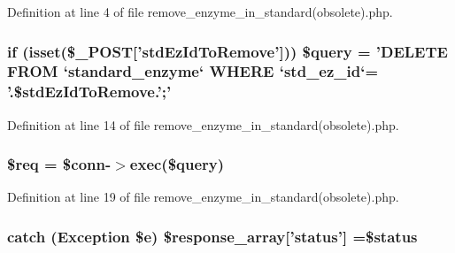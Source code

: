Definition at line 4 of file remove\-\_\-enzyme\-\_\-in\-\_\-standard(obsolete).\-php.

\hypertarget{remove__enzyme__in__standard_07obsolete_08_8php_a46a28a65a24f7a31388b22d12d2bb16a}{
\subsubsection[{\$query}]{\setlength{\rightskip}{0pt plus 5cm}if (isset(\$\-\_\-\-P\-O\-S\-T\mbox{[}'std\-Ez\-Id\-To\-Remove'\mbox{]})) \$query = 'D\-E\-L\-E\-T\-E F\-R\-O\-M `standard\-\_\-enzyme` W\-H\-E\-R\-E `std\-\_\-ez\-\_\-id`= '.\$std\-Ez\-Id\-To\-Remove.';'}}\label{remove__enzyme__in__standard_07obsolete_08_8php_a46a28a65a24f7a31388b22d12d2bb16a}


Definition at line 14 of file remove\-\_\-enzyme\-\_\-in\-\_\-standard(obsolete).\-php.

\hypertarget{remove__enzyme__in__standard_07obsolete_08_8php_a63a7a283ea5dee8af1e2d5a3435bf370}{
\subsubsection[{\$req}]{\setlength{\rightskip}{0pt plus 5cm}\$req = \$conn-\/$>$exec(\$query)}}\label{remove__enzyme__in__standard_07obsolete_08_8php_a63a7a283ea5dee8af1e2d5a3435bf370}


Definition at line 19 of file remove\-\_\-enzyme\-\_\-in\-\_\-standard(obsolete).\-php.

\hypertarget{remove__enzyme__in__standard_07obsolete_08_8php_a8452fb8131316637a04e25f5fde066d9}{
\subsubsection[{\$response\-\_\-array}]{\setlength{\rightskip}{0pt plus 5cm}catch (Exception \$e) \$response\-\_\-array\mbox{[}'status'\mbox{]} =\$status}}\label{remove__enzyme__in__standard_07obsolete_08_8php_a8452fb8131316637a04e25f5fde066d9}


